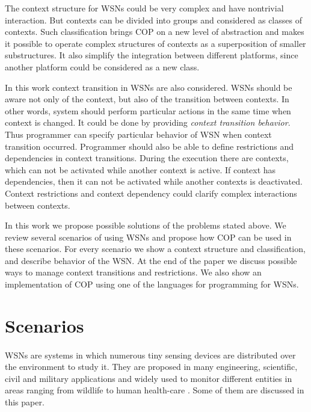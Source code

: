 \documentclass[12pt,a4paper]{article}
\begin{document}
The context structure for WSNs could be very complex and have nontrivial interaction. But contexts can be divided into groups and considered as classes of contexts. Such classification brings COP on a new level of abstraction and makes it possible to operate complex structures of contexts as a superposition of smaller substructures. It also simplify the integration between different platforms, since another platform could be considered as a new class.

In this work context transition in WSNs are also considered. WSNs should be aware not only of the context, but also of the transition between contexts. In other words, system should perform particular actions in the same time when context is changed. It could be done by providing \textit{context transition behavior}. Thus programmer can specify particular behavior of WSN when context transition occurred. Programmer should also be able to define restrictions and dependencies in context transitions. During the execution there are contexts, which can not be activated while another context is active. If context has dependencies, then it can not be activated while another contexts is deactivated. Context restrictions and context dependency could clarify complex interactions between contexts.

In this work we propose possible solutions of the problems stated above. We review several scenarios of using WSNs and propose how COP can be used in these scenarios. For every scenario we show a context structure and classification, and describe behavior of the WSN. At the end of the paper we discuss possible ways to manage context transitions and restrictions. We also show an implementation of COP using one of the languages for programming for WSNs.

\section{Scenarios}\label{sec:scn}
\paragraph{}
WSNs are systems in which numerous tiny sensing devices are distributed over the environment to study it. They are proposed in many engineering, scientific,  civil and military applications and widely used to monitor different entities in areas ranging from wildlife \cite{juang02} \cite{lingren08} \cite{pastor08} to human health-care \cite{lorincz09} \cite{alemdar10}. Some of them are discussed in this paper.
\end{document}
